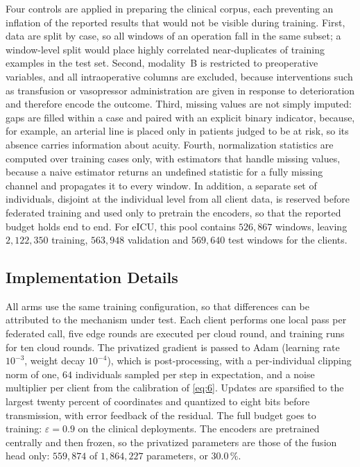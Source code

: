 Four controls are applied in preparing the clinical corpus, each preventing an
inflation of the reported results that would not be visible during training.
First, data are split by case, so all windows of an operation fall in the same
subset; a window-level split would place highly correlated near-duplicates of
training examples in the test set. Second, modality~B is restricted to
preoperative variables, and all intraoperative columns are excluded, because
interventions such as transfusion or vasopressor administration are given in
response to deterioration and therefore encode the outcome. Third, missing
values are not simply imputed: gaps are filled within a case and paired with
an explicit binary indicator, because, for example, an arterial line is placed
only in patients judged to be at risk, so its absence carries information
about acuity. Fourth, normalization statistics are computed over training cases
only, with estimators that handle missing values, because a naive estimator
returns an undefined statistic for a fully missing channel and propagates it to
every window. In addition, a separate set of individuals, disjoint at the
individual level from all client data, is reserved before federated training
and used only to pretrain the encoders, so that the reported budget holds end
to end. For eICU, this pool contains $526{,}867$ windows, leaving
$2{,}122{,}350$ training, $563{,}948$ validation and $569{,}640$ test windows
for the clients.

\subsection{Implementation Details}
\label{sec:exp:impl}

All arms use the same training configuration, so that differences can be
attributed to the mechanism under test. Each client performs one local pass per
federated call, five edge rounds are executed per cloud round, and training
runs for ten cloud rounds. The privatized gradient is passed to Adam
(learning rate $10^{-3}$, weight decay $10^{-4}$), which is post-processing,
with a per-individual clipping norm of one, $64$
individuals sampled per step in expectation, and a noise multiplier per client
from the calibration of \eqref{eq:6}.
Updates are sparsified to the largest twenty percent of coordinates and
quantized to eight bits before transmission, with error feedback of the
residual. The full budget goes to training: $\varepsilon = 0.9$ on the
clinical deployments. The encoders are pretrained centrally and then frozen, so the
privatized parameters are those of the fusion head only: $559{,}874$ of
$1{,}864{,}227$ parameters, or $30.0\,\%$.

